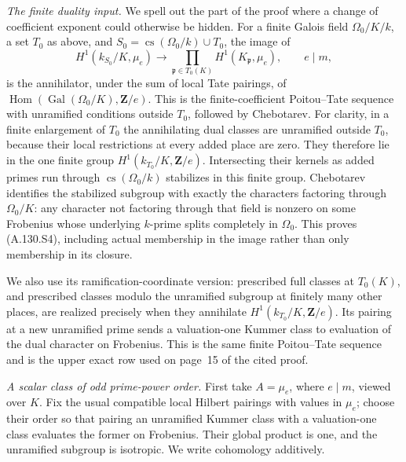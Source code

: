\emph{The finite duality input.}
We spell out the part of the proof where a change of coefficient
exponent could otherwise be hidden.  For a finite Galois field
\(\Omega_0/K/k\), a set \(T_0\) as above, and
\(S_0=\operatorname{cs}(\Omega_0/k)\cup T_0\), the image of
\[
 H^1(k_{S_0}/K,\mu_e)\longrightarrow
       \prod_{\mathfrak p\in T_0(K)}H^1(K_{\mathfrak p},\mu_e),
                       \qquad e\mid m,
 \tag{A.130.S4}
\]
is the annihilator, under the sum of local Tate pairings, of
\(\operatorname{Hom}(\operatorname{Gal}(\Omega_0/K),\mathbf Z/e)\).
This is the finite-coefficient Poitou--Tate sequence with
unramified conditions outside \(T_0\), followed by Chebotarev.
For clarity, in a finite enlargement of \(T_0\) the annihilating
dual classes are unramified outside \(T_0\), because their
local restrictions at every added place are zero.  They
therefore lie in the one finite group
\(H^1(k_{T_0}/K,\mathbf Z/e)\).
Intersecting their kernels as added primes run through
\(\operatorname{cs}(\Omega_0/k)\) stabilizes in this finite group.
Chebotarev identifies the stabilized subgroup with exactly
the characters factoring through \(\Omega_0/K\): any character
not factoring through that field is nonzero on some Frobenius
whose underlying \(k\)-prime splits completely in \(\Omega_0\).
This proves (A.130.S4), including actual membership in the
image rather than only membership in its closure.

We also use its ramification-coordinate version:
prescribed full classes at \(T_0(K)\), and prescribed classes
modulo the unramified subgroup at finitely many other places,
are realized precisely when they annihilate
\(H^1(k_{T_0}/K,\mathbf Z/e)\).
Its pairing at a new unramified prime sends a valuation-one
Kummer class to evaluation of the dual character on Frobenius.
This is the same finite Poitou--Tate sequence and is the upper
exact row used on page~15 of the cited proof.

\emph{A scalar class of odd prime-power order.}
First take \(A=\mu_e\), where \(e\mid m\), viewed over \(K\).
Fix the usual compatible local Hilbert pairings with values
in \(\mu_e\); choose their order so that pairing an
unramified Kummer class with a valuation-one class evaluates
the former on Frobenius.
Their global product is one, and the unramified subgroup
is isotropic.  We write cohomology additively.

